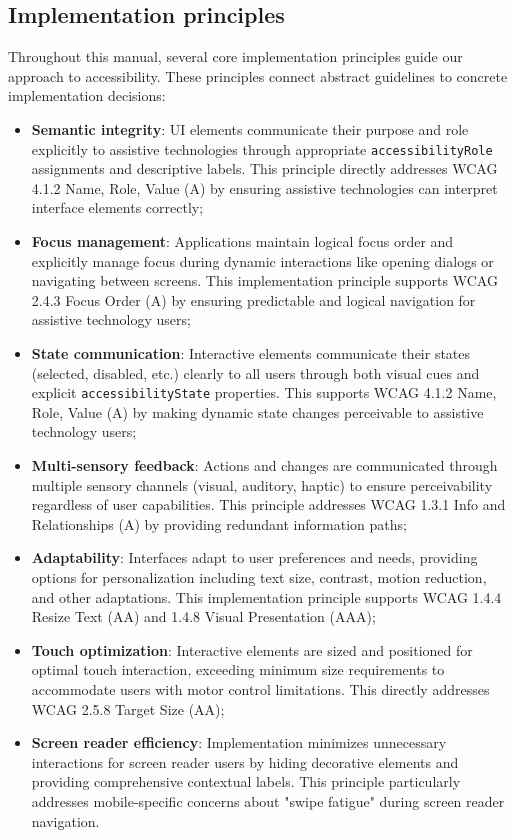 \subsection{Implementation principles}
\label{subsec:dev-principles}

Throughout this manual, several core implementation principles guide our approach to accessibility. These principles connect abstract guidelines to concrete implementation decisions:

\begin{itemize}
    \item \textbf{Semantic integrity}: UI elements communicate their purpose and role explicitly to assistive technologies through appropriate \texttt{accessibilityRole} assignments and descriptive labels. This principle directly addresses WCAG 4.1.2 Name, Role, Value (A) by ensuring assistive technologies can interpret interface elements correctly;
    
    \item \textbf{Focus management}: Applications maintain logical focus order and explicitly manage focus during dynamic interactions like opening dialogs or navigating between screens. This implementation principle supports WCAG 2.4.3 Focus Order (A) by ensuring predictable and logical navigation for assistive technology users;
    
    \item \textbf{State communication}: Interactive elements communicate their states (selected, disabled, etc.) clearly to all users through both visual cues and explicit \texttt{accessibilityState} properties. This supports WCAG 4.1.2 Name, Role, Value (A) by making dynamic state changes perceivable to assistive technology users;
    
    \item \textbf{Multi-sensory feedback}: Actions and changes are communicated through multiple sensory channels (visual, auditory, haptic) to ensure perceivability regardless of user capabilities. This principle addresses WCAG 1.3.1 Info and Relationships (A) by providing redundant information paths;
    
    \item \textbf{Adaptability}: Interfaces adapt to user preferences and needs, providing options for personalization including text size, contrast, motion reduction, and other adaptations. This implementation principle supports WCAG 1.4.4 Resize Text (AA) and 1.4.8 Visual Presentation (AAA);
    
    \item \textbf{Touch optimization}: Interactive elements are sized and positioned for optimal touch interaction, exceeding minimum size requirements to accommodate users with motor control limitations. This directly addresses WCAG 2.5.8 Target Size (AA);
    
    \item \textbf{Screen reader efficiency}: Implementation minimizes unnecessary interactions for screen reader users by hiding decorative elements and providing comprehensive contextual labels. This principle particularly addresses mobile-specific concerns about "swipe fatigue" during screen reader navigation.
\end{itemize}


